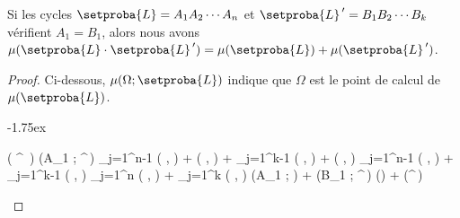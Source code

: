     


\begin{fact} \label{nline-pseudo-chasles}
    Si les cycles
    $\setproba{L} = A_1 A_2 \cdots A_n$
    et
    $\setproba{L}^{\,\prime} = B_1 B_2 \cdots B_k$
    vérifient $A_1 = B_1$, alors nous avons
    $ \mu( \setproba{L} \cdot \setproba{L}^{\,\prime} )
    = \mu( \setproba{L} ) + \mu( \setproba{L}^{\,\prime} )$.
\end{fact}


\begin{proof}
	Ci-dessous, $\mu(\Omega ; \setproba{L})$ indique que $\Omega$ est le point de calcul de $\mu(\setproba{L})$.

    \smallskip
    
    \noindent\kern-1.75ex
    \begin{stepcalc}[style=ar*]
    	\mu(  \cdot {}^{\,\prime} )
	\explnext{}
    	\mu(A_1 ;  \cdot {}^{\,\prime})
	\explnext{}
    	\dsum_{j=1}^{n-1}
			\det \big(  ,  \big)
    	+
	    	\det \big(  ,  \big)
    	+
	    \dsum_{j=1}^{k-1}
			\det \big(  ,  \big)
    	+
	    	\det \big(  ,  \big)
	\explnext{}
    	\dsum_{j=1}^{n-1}
			\det \big(  ,  \big)
    	+
	    \dsum_{j=1}^{k-1}
			\det \big(  ,  \big)
    	\dsum_{j=1}^{n}
			\det \big(  ,  \big)
    	+
	    \dsum_{j=1}^{k}
			\det \big(  ,  \big)
	\explnext{}
    	\mu(A_1 ; ) + \mu(B_1 ; ^{\,\prime})
	\explnext{}
    	\mu() + \mu(^{\,\prime})
    \end{stepcalc}

    \null\vspace{-3.5ex}
\end{proof}




\newpage

